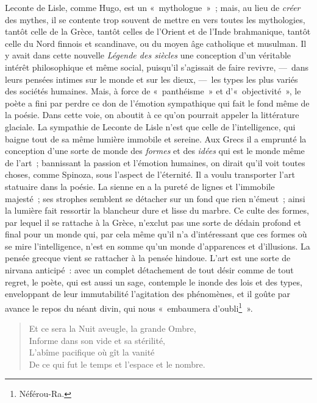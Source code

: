 \documentclass[french,twoside]{book} %
\begin{document}
Leconte de Lisle, comme Hugo, est un « mythologue » ; mais, au lieu de \emph{créer} des mythes, il se contente trop souvent de mettre en vers toutes les mythologies, tantôt celle de la Grèce, tantôt celles de l’Orient et de l’Inde brahmanique, tantôt celle du Nord finnois et scandinave, ou du moyen âge catholique et musulman. Il y avait dans cette nouvelle \emph{Légende des siècles} une conception d’un véritable intérêt philosophique et même social, puisqu’il s’agissait de faire revivre, — dans leurs pensées intimes sur le monde et sur les dieux, — les types les plus variés des sociétés humaines. Mais, à force de « panthéisme » et d’« objectivité », le poète a fini par perdre ce don de l’émotion sympathique qui fait le fond même de la poésie. Dans cette voie, on aboutit à ce qu’on pourrait appeler la littérature glaciale. La sympathie de Leconte de Lisle n’est que celle de l’intelligence, qui baigne tout de sa même lumière immobile et sereine. Aux Grecs il a emprunté la conception d’une sorte de monde des \emph{formes} et des \emph{idées} qui est le monde même de l’art ; bannissant la passion et l’émotion humaines, on dirait qu’il voit toutes choses, comme Spinoza, sous l’aspect de l’éternité. Il a voulu transporter l’art statuaire dans la poésie. La sienne en a la pureté de lignes et l’immobile majesté ; ses strophes semblent se détacher sur un fond que rien n’émeut ; ainsi la lumière fait ressortir la blancheur dure et lisse du marbre. Ce culte des formes, par lequel il se rattache à la Grèce, n’exclut pas une sorte de dédain profond et final pour un monde qui, par cela même qu’il n’a d’intéressant que ces formes où se mire l’intelligence, n’est en somme qu’un monde d’apparences et d’illusions. La pensée grecque vient se rattacher à la pensée hindoue. L’art est une sorte de nirvana anticipé : avec un complet détachement de tout désir comme de tout regret, le poète, qui est aussi un sage, contemple le inonde des lois et des types, enveloppant de leur immutabilité l’agitation des phénomènes, et il goûte par avance le repos du néant divin, qui nous « embaumera d’oubli\footnote{Néférou-Ra.} ».\par


\begin{verse}
Et ce sera la Nuit aveugle, la grande Ombre,\\
Informe dans son vide et sa stérilité,\\
L’abîme pacifique où gît la vanité\\
De ce qui fut le temps et l’espace et le nombre.\\
\end{verse}
\end{document}
